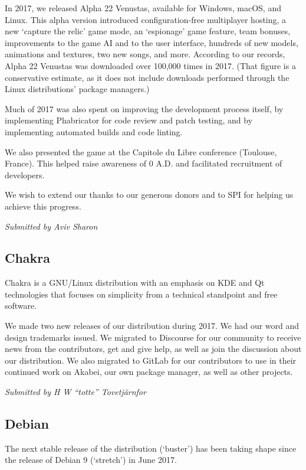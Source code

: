\documentclass[a4paper]{report}
\begin{document}
In 2017, we released Alpha 22 Venustas, available for Windows, macOS,
and Linux. This alpha version introduced configuration-free multiplayer
hosting, a new `capture the relic' game mode, an `espionage' game
feature, team bonuses, improvements to the game AI and to the user
interface, hundreds of new models, animations and textures, two new
songs, and more.  According to our records, Alpha 22 Venustas was
downloaded over 100,000 times in 2017. (That figure is a conservative
estimate, as it does not include downloads performed through the Linux
distributions' package managers.)

Much of 2017 was also spent on improving the development process itself,
by implementing Phabricator for code review and patch testing, and by
implementing automated builds and code linting.

We also presented the game at the Capitole du Libre conference
(Toulouse, France). This helped raise awareness of 0 A.D. and
facilitated recruitment of developers.

We wish to extend our thanks to our generous donors and to SPI for
helping us achieve this progress.

{\em Submitted by Aviv Sharon}

\subsection{Chakra}

Chakra is a GNU/Linux distribution with an emphasis on KDE and Qt
technologies that focuses on simplicity from a technical standpoint and
free software.

We made two new releases of our distribution during 2017. We had our
word and design trademarks issued. We migrated to Discourse for our
community to receive news from the contributors, get and give help, as
well as join the discussion about our distribution. We also migrated to
GitLab for our contributors to use in their continued work on Akabei,
our own package manager, as well as other projects.

{\em Submitted by H W ``totte'' Tovetjärnfor}

\subsection{Debian}

The next stable release of the distribution (`buster') has been taking
shape since the release of Debian 9 (`stretch') in June 2017.
\end{document}
